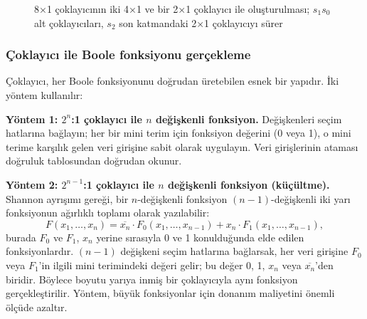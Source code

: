 \begin{figure}[H]
\caption[8×1 çoklayıcının 4×1 ve 2×1 çoklayıcılarla oluşturulması]{8×1 çoklayıcının iki 4×1 ve bir 2×1 çoklayıcı ile oluşturulması; $s_1 s_0$ alt çoklayıcıları, $s_2$ son katmandaki 2×1 çoklayıcıyı sürer}
\label{fig:B.mux-hierarchical}
\end{figure}


\subsubsection{Çoklayıcı ile Boole fonksiyonu gerçekleme}
Çoklayıcı, her Boole fonksiyonunu doğrudan üretebilen esnek bir yapıdır. İki yöntem kullanılır:

\textbf{Yöntem 1: $2^n$:1 çoklayıcı ile $n$ değişkenli fonksiyon.}
Değişkenleri seçim hatlarına bağlayın; her bir mini terim için fonksiyon değerini (0 veya 1), o mini terime karşılık gelen veri girişine sabit olarak uygulayın. Veri girişlerinin ataması doğruluk tablosundan doğrudan okunur.

\textbf{Yöntem 2: $2^{n-1}$:1 çoklayıcı ile $n$ değişkenli fonksiyon (küçültme).}
Shannon ayrışımı gereği, bir $n$-değişkenli fonksiyon $(n-1)$-değişkenli iki yarı fonksiyonun ağırlıklı toplamı olarak yazılabilir:
\[ F(x_1,\ldots,x_n) = \overline{x_n}\cdot F_0(x_1,\ldots,x_{n-1}) + x_n \cdot F_1(x_1,\ldots,x_{n-1}), \]
burada $F_0$ ve $F_1$, $x_n$ yerine sırasıyla 0 ve 1 konulduğunda elde edilen fonksiyonlardır. $(n-1)$ değişkeni seçim hatlarına bağlarsak, her veri girişine $F_0$ veya $F_1$'in ilgili mini terimindeki değeri gelir; bu değer 0, 1, $x_n$ veya $\overline{x_n}$'den biridir. Böylece boyutu yarıya inmiş bir çoklayıcıyla aynı fonksiyon gerçekleştirilir. Yöntem, büyük fonksiyonlar için donanım maliyetini önemli ölçüde azaltır.

